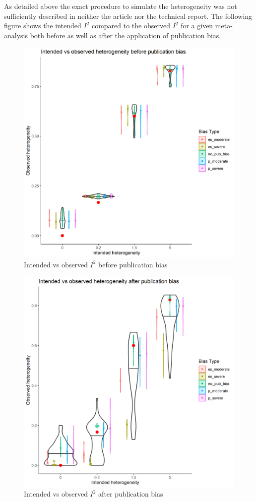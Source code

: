 \documentclass[
  english,
  doc,floatsintext,draftall]{apa6}
\begin{document}
As detailed above the exact procedure to simulate the heterogeneity was not sufficiently described in neither the article nor the technical report. The following figure shows the intended \(I^2\) compared to the observed \(I^2\) for a given meta-analysis both before as well as after the application of publication bias.

\begin{figure}
 \includegraphics[width=400pt]{../figures/i_squared_unbiased} \caption{Intended vs observed $I^2$ before publication bias}\label{fig:unnamed-chunk-3}
 \end{figure}

\begin{figure}
\includegraphics[width=400pt]{../figures/i_squared_biased} \caption{Intended vs observed $I^2$ after publication bias}\label{fig:unnamed-chunk-4}
\end{figure}
\end{document}
